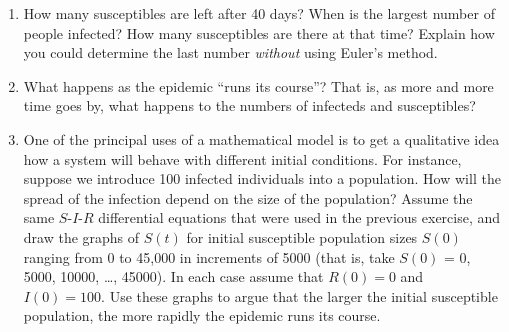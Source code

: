 \begin{enumerate}
\item How many susceptibles are left after 40 days?  When is the
largest number of people infected?  How many susceptibles are there at
that time?  Explain how you could determine the last number {\em
  without\/} using Euler's method.


\item What happens as the epidemic ``runs its course''?  That is, as
more and more time goes by, what happens to the numbers of infecteds
and susceptibles?


\item One of the principal uses of a mathematical model is to get a
qualitative idea how a system will behave with different initial
conditions.  For instance, suppose we introduce 100 infected
individuals into a population.  How will the spread of the infection
depend on the size of the population?  Assume the same $S$-$I$-$R$
differential equations that were used in the previous exercise, and
draw the graphs of $S(t)$ for initial susceptible population sizes
$S(0)$ ranging from 0 to 45,000 in increments of 5000 (that is, take
$S(0)$ = 0, 5000, 10000, \ldots , 45000).  In each case assume that
$R(0) = 0$ and $I(0) = 100$.  Use these graphs to argue that the
larger the initial susceptible population, the more rapidly the
epidemic runs its course.




\end{enumerate}
